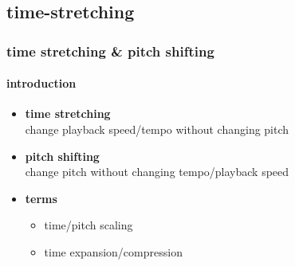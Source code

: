 \subsection{time-stretching}
\begin{frame}\frametitle{time stretching \& pitch shifting}\framesubtitle{introduction}
	\begin{itemize}
		\item	\textbf{time stretching}\\
			change playback speed/tempo without changing pitch
		\pause
        \bigskip
		\item	\textbf{pitch shifting}\\
			change pitch without changing tempo/playback speed
		\pause
        \bigskip
		\item	\textbf{terms}
            \begin{itemize}
                \item   time/pitch scaling
                \item   time expansion/compression
            \end{itemize}
	\end{itemize}

\end{frame}

